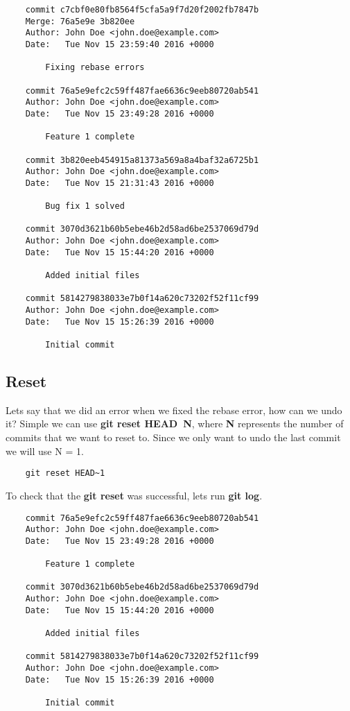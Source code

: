 \documentclass{article}
\begin{document}
\begin{lstlisting}
	commit c7cbf0e80fb8564f5cfa5a9f7d20f2002fb7847b
	Merge: 76a5e9e 3b820ee
	Author: John Doe <john.doe@example.com>
	Date:   Tue Nov 15 23:59:40 2016 +0000

    	Fixing rebase errors

	commit 76a5e9efc2c59ff487fae6636c9eeb80720ab541
	Author: John Doe <john.doe@example.com>
	Date:   Tue Nov 15 23:49:28 2016 +0000

    	Feature 1 complete

	commit 3b820eeb454915a81373a569a8a4baf32a6725b1
	Author: John Doe <john.doe@example.com>
	Date:   Tue Nov 15 21:31:43 2016 +0000

    	Bug fix 1 solved

	commit 3070d3621b60b5ebe46b2d58ad6be2537069d79d
	Author: John Doe <john.doe@example.com>
	Date:   Tue Nov 15 15:44:20 2016 +0000

    	Added initial files

	commit 5814279838033e7b0f14a620c73202f52f11cf99
	Author: John Doe <john.doe@example.com>
	Date:   Tue Nov 15 15:26:39 2016 +0000

    	Initial commit
\end{lstlisting}

\subsection{Reset}

Lets say that we did an error when we fixed the rebase error, how can we undo it? Simple we can use \textbf{git reset HEAD~N}, where \textbf{N} represents the number of commits that we want to reset to. Since we only want to undo the last commit we will use N = 1.

\begin{lstlisting}
	git reset HEAD~1
\end{lstlisting}

To check that the \textbf{git reset} was successful, lets run \textbf{git log}.

\begin{lstlisting}
	commit 76a5e9efc2c59ff487fae6636c9eeb80720ab541
	Author: John Doe <john.doe@example.com>
	Date:   Tue Nov 15 23:49:28 2016 +0000

    	Feature 1 complete

	commit 3070d3621b60b5ebe46b2d58ad6be2537069d79d
	Author: John Doe <john.doe@example.com>
	Date:   Tue Nov 15 15:44:20 2016 +0000

    	Added initial files

	commit 5814279838033e7b0f14a620c73202f52f11cf99
	Author: John Doe <john.doe@example.com>
	Date:   Tue Nov 15 15:26:39 2016 +0000

    	Initial commit
\end{lstlisting}
\end{document}
